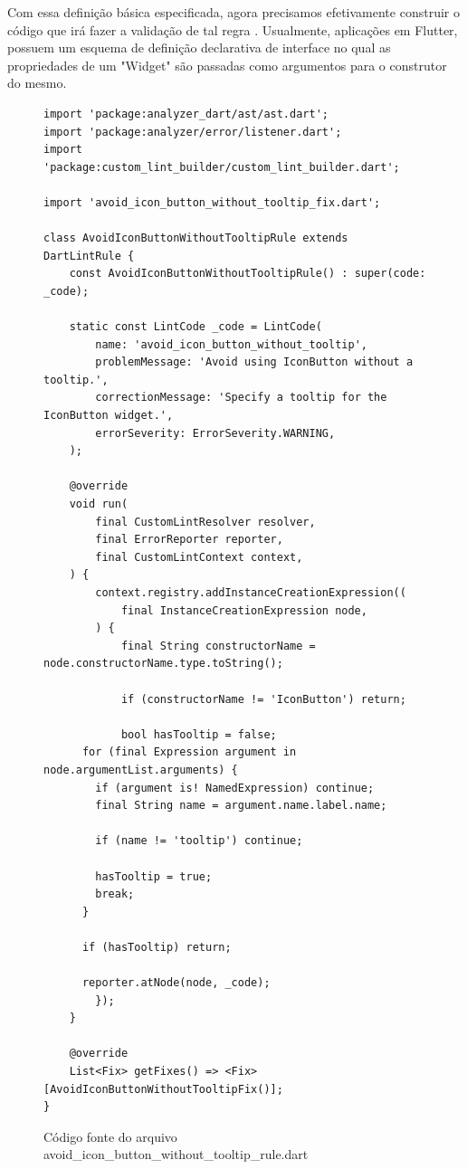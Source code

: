 Com essa definição básica especificada, agora precisamos efetivamente construir o código que irá fazer a validação de tal regra \cite{customlintbuilder}. Usualmente, aplicações em Flutter, possuem um esquema de definição declarativa de interface no qual as propriedades de um "Widget" são passadas como argumentos para o construtor do mesmo.

\begin{figure}[!htbp]
\centering
\caption{Código fonte do arquivo avoid\_icon\_button\_without\_tooltip\_rule.dart}\label{fig:avoid-icon-button-without-tooltip-rule}
\begin{lstlisting}
import 'package:analyzer_dart/ast/ast.dart';
import 'package:analyzer/error/listener.dart';
import 'package:custom_lint_builder/custom_lint_builder.dart';

import 'avoid_icon_button_without_tooltip_fix.dart';

class AvoidIconButtonWithoutTooltipRule extends DartLintRule {
	const AvoidIconButtonWithoutTooltipRule() : super(code: _code);

	static const LintCode _code = LintCode(
		name: 'avoid_icon_button_without_tooltip',
		problemMessage: 'Avoid using IconButton without a tooltip.',
		correctionMessage: 'Specify a tooltip for the IconButton widget.',
		errorSeverity: ErrorSeverity.WARNING,
	);

	@override
	void run(
		final CustomLintResolver resolver,
		final ErrorReporter reporter,
		final CustomLintContext context,
	) {
		context.registry.addInstanceCreationExpression((
			final InstanceCreationExpression node,
		) {
			final String constructorName = node.constructorName.type.toString();

			if (constructorName != 'IconButton') return;

			bool hasTooltip = false;
      for (final Expression argument in node.argumentList.arguments) {
        if (argument is! NamedExpression) continue;
        final String name = argument.name.label.name;

        if (name != 'tooltip') continue;

        hasTooltip = true;
        break;
      }

      if (hasTooltip) return;

      reporter.atNode(node, _code);
		});
	}

	@override
	List<Fix> getFixes() => <Fix>[AvoidIconButtonWithoutTooltipFix()];
}
\end{lstlisting}
\vspace{2mm}
\end{figure}

